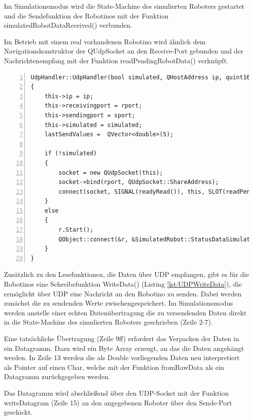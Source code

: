 Im Simulationsmodus wird die State-Machine des simulierten Roboters gestartet und die Sendefunktion des Robotinos mit der Funktion simulatedRobotDataReceived() verbunden.

Im Betrieb mit einem real vorhandenen Robotino wird ähnlich dem Navigationskonstruktor der QUdpSocket an den Receive-Port gebunden und der Nachrichtenempfang mit der Funktion readPendingRobotData() verknüpft. 

\begin{lstlisting}[frame=single, breaklines=true, numbers=left, stepnumber=2, firstnumber=1, numberstyle = \tiny, caption=UDP-Handler Konstruktor für Navigationsdatenaustausch,label=lst:KonstruktorUDPRob]
UdpHandler::UdpHandler(bool simulated, QHostAddress ip, quint16 sport, quint16 rport, QObject *parent) : QObject(parent)
{
    this->ip = ip;
    this->receivingport = rport;
    this->sendingport = sport;
    this->simulated = simulated;
    lastSendValues =  QVector<double>(5);

    if (!simulated)
    {
        socket = new QUdpSocket(this);
        socket->bind(rport, QUdpSocket::ShareAddress);
        connect(socket, SIGNAL(readyRead()), this, SLOT(readPendingRobotData()));
    }
    else
    {
        r.Start();
        QObject::connect(&r, &SimulatedRobot::StatusDataSimulatedReceived, this, &UdpHandler::simulatedRobotDataReceived);
    }
}

\end{lstlisting}

Zusätzlich zu den Lesefunktionen, die Daten über UDP empfangen, gibt es für die Robotinos eine Schreibefunktion WriteData() (Listing \ref{lst:UDPWriteData}), die ermöglicht über UDP eine Nachricht an den Robotino zu senden. Dabei werden zunächst die zu sendenden Werte zwischengespeichert. Im Simulationsmodus werden anstelle einer echten Datenübertragung die zu versendenden Daten direkt in die State-Machine des simulierten Roboters geschrieben (Zeile 2-7). 

Eine tatsächliche Übertragung (Zeile 9ff) erfordert das Verpacken der Daten in ein Datagramm. Dazu wird ein Byte Array erzeugt, an das die Daten angehängt werden. In Zeile 13 werden die als Double vorliegenden Daten neu interpretiert als Pointer auf einen Char, welche mit der Funktion fromRawData als ein Datagramm zurückgegeben werden. 

Das Datagramm wird abschließend über den UDP-Socket mit der Funktion writeDatagram (Zeile 15) an den angegebenen Roboter über den Sende-Port geschickt. 

